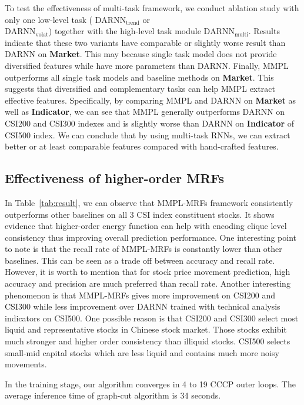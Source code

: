To test the effectiveness of multi-task framework, we conduct
ablation study with only one low-level task (\quad
$\text{DARNN}_\text{trend}$ \quad or \\
$\text{DARNN}_\text{volat}$) together with the high-level task
module $\text{DARNN}_\text{multi}$. Results indicate that these
two variants have comparable or slightly worse result than DARNN
on \textbf{Market}. This may because single task model does not
provide diversified features while have more parameters than
DARNN. Finally, MMPL outperforms all single task models and
baseline methods on \textbf{Market}. This suggests that
diversified and complementary tasks can help MMPL extract
effective features. Specifically, by comparing MMPL and DARNN on
\textbf{Market} as well as \textbf{Indicator}, we can see that
MMPL generally outperforms DARNN on CSI200 and CSI300 indexes and
is slightly worse than DARNN on \textbf{Indicator} of CSI500
index. We can conclude that by using multi-task RNNs, we can
extract better or at least comparable features compared with
hand-crafted features.

\subsection{Effectiveness of higher-order MRFs}
In Table~\ref{tab:result}, we can observe that MMPL-MRFs
framework consistently outperforms other baselines on all 3 CSI
index constituent stocks. It shows evidence that higher-order
energy function can help with encoding clique level consistency
thus improving overall prediction performance. One interesting
point to note is that the recall rate of MMPL-MRFs is constantly
lower than other baselines. This can be seen as a trade off
between accuracy and recall rate. However, it is worth to mention
that for stock price movement prediction, high accuracy and
precision are much preferred than recall rate. Another
interesting phenomenon is that MMPL-MRFs gives more improvement
on CSI200 and CSI300 while less improvement over DARNN trained
with technical analysis indicators on CSI500. One possible reason
is that CSI200 and CSI300 select most liquid and representative
stocks in Chinese stock market. Those stocks exhibit much
stronger and higher order consistency than illiquid stocks.
CSI500 selects small-mid capital stocks which are less liquid and
contains much more noisy movements.

In the training stage, our algorithm converges in 4 to 19
CCCP outer loops. The average inference time of graph-cut
algorithm is 34 seconds.

